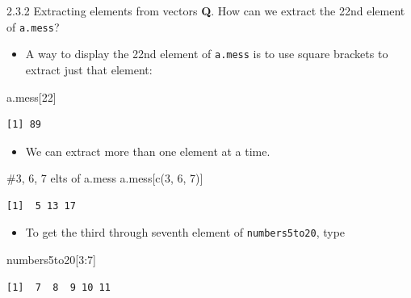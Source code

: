 \documentclass[
  9pt,
  a4paper,
  ignorenonframetext,
  notheorems]{beamer}
\newenvironment{Shaded}{\begin{snugshade}}{\end{snugshade}}
\newcommand{\CommentTok}[1]{\textcolor[rgb]{0.37,0.37,0.37}{#1}}
\newcommand{\DecValTok}[1]{\textcolor[rgb]{0.68,0.00,0.00}{#1}}
\newcommand{\FunctionTok}[1]{\textcolor[rgb]{0.28,0.35,0.67}{#1}}
\newcommand{\NormalTok}[1]{\textcolor[rgb]{0.00,0.23,0.31}{#1}}
\newcommand{\SpecialCharTok}[1]{\textcolor[rgb]{0.37,0.37,0.37}{#1}}
\providecommand{\tightlist}{%
  \setlength{\itemsep}{0pt}\setlength{\parskip}{0pt}}\usepackage{longtable,booktabs,array}
\begin{document}
\begin{frame}[fragile]{2.3.2 Extracting elements from vectors}
\protect\hypertarget{extracting-elements-from-vectors}{}
\textbf{Q}. How can we extract the 22nd element of \texttt{a.mess}?

\begin{itemize}
\tightlist
\item
  A way to display the 22nd element of \texttt{a.mess} is to use square
  brackets to extract just that element:
\end{itemize}

\begin{Shaded}
\begin{Highlighting}[]
\NormalTok{a.mess[}\DecValTok{22}\NormalTok{]}
\end{Highlighting}
\end{Shaded}

\begin{verbatim}
[1] 89
\end{verbatim}

\begin{itemize}
\tightlist
\item
  We can extract more than one element at a time.
\end{itemize}

\begin{Shaded}
\begin{Highlighting}[]
\CommentTok{\#3, 6, 7 elts of \textasciigrave{}a.mess\textasciigrave{}}
\NormalTok{a.mess[}\FunctionTok{c}\NormalTok{(}\DecValTok{3}\NormalTok{, }\DecValTok{6}\NormalTok{, }\DecValTok{7}\NormalTok{)]}
\end{Highlighting}
\end{Shaded}

\begin{verbatim}
[1]  5 13 17
\end{verbatim}

\begin{itemize}
\tightlist
\item
  To get the third through seventh element of \texttt{numbers5to20},
  type
\end{itemize}

\begin{Shaded}
\begin{Highlighting}[]
\NormalTok{numbers5to20[}\DecValTok{3}\SpecialCharTok{:}\DecValTok{7}\NormalTok{]}
\end{Highlighting}
\end{Shaded}

\begin{verbatim}
[1]  7  8  9 10 11
\end{verbatim}
\end{frame}
\end{document}
